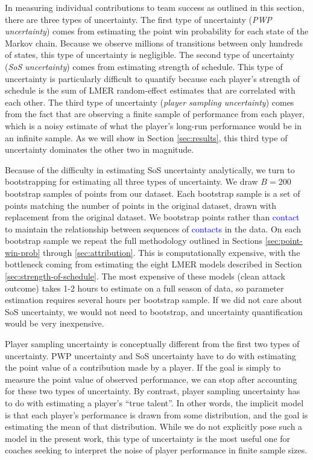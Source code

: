\documentclass[USenglish]{article}
\theoremstyle{dgthm}
\theoremstyle{dgdef}
\begin{document}
In measuring individual contributions to team success as outlined in this section, there are three types of uncertainty. The first type of uncertainty ({\it PWP uncertainty}) comes from estimating the point win probability for each state of the Markov chain. Because we observe millions of transitions between only hundreds of states, this type of uncertainty is negligible. The second type of uncertainty ({\it SoS uncertainty}) comes from estimating strength of schedule. This type of uncertainty is particularly difficult to quantify because each player's strength of schedule is the sum of LMER random-effect estimates that are correlated with each other. The third type of uncertainty ({\it player sampling uncertainty}) comes from the fact that are observing a finite sample of performance from each player, which is a noisy estimate of what the player's long-run performance would be in an infinite sample. As we will show in Section \ref{sec:results}, this third type of uncertainty dominates the other two in magnitude.

Because of the difficulty in estimating SoS uncertainty analytically, we turn to bootstrapping for estimating all three types of uncertainty. We draw $B = 200$ bootstrap samples of points from our dataset. Each bootstrap sample is a set of points matching the number of points in the original dataset, drawn with replacement from the original dataset. We bootstrap points rather than \textcolor{blue}{contact} to maintain the relationship between sequences of \textcolor{blue}{contacts} in the data. On each bootstrap sample we repeat the full methodology outlined in Sections \ref{sec:point-win-prob} through \ref{sec:attribution}. This is computationally expensive, with the bottleneck coming from estimating the eight LMER models described in Section \ref{sec:strength-of-schedule}. The most expensive of these models (clean attack outcome) takes 1-2 hours to estimate on a full season of data, so parameter estimation requires several hours per bootstrap sample. If we did not care about SoS uncertainty, we would not need to bootstrap, and uncertainty quantification would be very inexpensive.

Player sampling uncertainty is conceptually different from the first two types of uncertainty. PWP uncertainty and SoS uncertainty have to do with estimating the point value of a contribution made by a player. If the goal is simply to measure the point value of observed performance, we can stop after accounting for these two types of uncertainty. By contrast, player sampling uncertainty has to do with estimating a player's ``true talent''. In other words, the implicit model is that each player's performance is drawn from some distribution, and the goal is estimating the mean of that distribution. While we do not explicitly pose such a model in the present work, this type of uncertainty is the most useful one for coaches seeking to interpret the noise of player performance in finite sample sizes.
\end{document}
